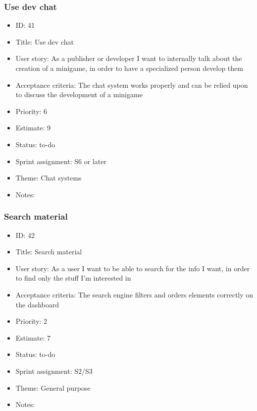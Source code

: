 \subsubsection{Use dev chat}
\begin{itemize}
	\item ID: 41
	\item Title: Use dev chat
	\item User story: As a publisher or developer I want to internally talk about the creation of a minigame, in order to have a specialized person develop them
	\item Acceptance criteria: The chat system works properly and can be relied upon to discuss the development of a minigame
	\item Priority: 6
	\item Estimate: 9
	\item Status: to-do
	\item Sprint assignment: S6 or later
	\item Theme: Chat systems
	\item Notes:
\end{itemize}

\subsubsection{Search material}
\begin{itemize}
	\item ID: 42
	\item Title: Search material
	\item User story: As a user I want to be able to search for the info I want, in order to find only the stuff I'm interested in
	\item Acceptance criteria: The search engine filters and orders elements correctly on the dashboard
	\item Priority: 2
	\item Estimate: 7
	\item Status: to-do
	\item Sprint assignment: S2/S3
	\item Theme: General purpose
	\item Notes:
\end{itemize}

